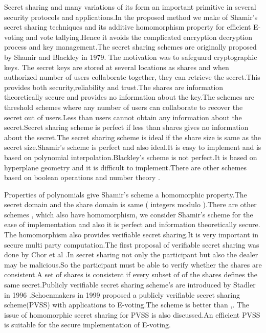 \documentclass[conference]{IEEEtran}
\begin{document}
Secret sharing and many variations of its form an important primitive in several security protocols and applications.In the proposed method we make of Shamir's \cite{shamir1979} secret sharing techniques and its additive homomorphism property for efficient E-voting and vote tallying.Hence it avoids the complicated encryption decryption process and key management.The secret sharing schemes are originally proposed by Shamir \cite{shamir1979} and Blackley \cite{blakley1979} in 1979.
The motivation was to safeguard cryptographic keys.	The secret keys are stored at several locations as shares and when authorized number of users collaborate together, they can retrieve the secret.This provides both security,reliability and trust.The shares are information theoretically secure and provides no information about the key.The schemes are  threshold schemes where any  number of users can collaborate to recover the secret out of  users.Less than  users cannot obtain any information about the secret.Secret sharing scheme is perfect if less than  shares gives no information about the secret.The secret sharing scheme is ideal if the share size is same as the secret size.Shamir's scheme is perfect and also ideal.It is easy to implement and is based on polynomial interpolation.Blackley's scheme is not perfect.It is based on hyperplane geometry and it is difficult to implement.There are other schemes based on boolean operations \cite{kuri2009xor} \cite{wang2007ssboln} and number theory \cite{mignotte1983} \cite{asmuth1983}.


Properties of polynomials give Shamir's scheme a  homomorphic property.The secret domain and the share domain is same ( integers modulo ).There are other schemes \cite{asmuth1983modular},\cite{kothari1985generalized} which also have  homomorphism, we consider Shamir's scheme for the ease of implementation and also it is perfect and information theoretically secure.
The homomorphism also provides verifiable secret sharing.It is very important in secure multi party computation.The first proposal of verifiable secret sharing was done by Chor et al \cite{chor1985verifiable}.In secret sharing not only the participant but also the dealer may be malicious.So the participant must be able to verify whether the shares are consistent.A set of  shares is  consistent if every subset of  of the  shares defines the same secret.Publicly verifiable secret sharing scheme's are introduced by Stadler in 1996 \cite{stadler1996publicly}.Schoenmakers \cite{schoenmakers1999simple} in 1999 proposed a publicly verifiable secret sharing scheme(PVSS) with applications to E-voting.The scheme is better than \cite{cramery1997secure},\cite{cohen1985robust}. The issue of homomorphic secret sharing for PVSS is also discussed.An efficient PVSS is suitable for the secure implementation of E-voting.
\end{document}
